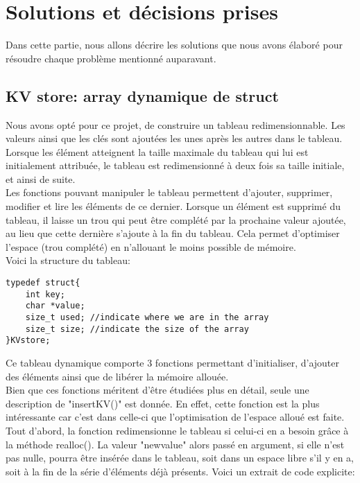 \documentclass[11pt,a4paper]{article}
\begin{document}
\section{Solutions et décisions prises}
Dans cette partie, nous allons décrire les solutions que nous avons élaboré pour résoudre chaque problème mentionné auparavant. 

\newpage
\subsection{KV store: array dynamique de struct}
Nous avons opté pour ce projet, de construire un tableau redimensionnable. Les valeurs ainsi que les clés sont ajoutées les unes après les autres dans le tableau. Lorsque les élément atteignent la taille maximale du tableau qui lui est initialement attribuée, le tableau est redimensionné à deux fois sa taille initiale, et ainsi de suite.\\
Les fonctions pouvant manipuler le tableau permettent d'ajouter, supprimer, modifier et  lire les éléments de ce dernier. Lorsque un élément est supprimé du tableau, il laisse un trou qui peut être complété par la prochaine valeur ajoutée, au lieu que cette dernière s'ajoute à la fin du tableau. Cela permet d'optimiser l'espace (trou complété) en n'allouant le moins possible de mémoire.\\
Voici la structure du tableau:

\begin{lstlisting}
typedef struct{
    int key; 
    char *value;
    size_t used; //indicate where we are in the array
    size_t size; //indicate the size of the array
}KVstore;
\end{lstlisting}

Ce tableau dynamique comporte 3 fonctions permettant d'initialiser, d'ajouter des éléments ainsi que de libérer la mémoire allouée. \\
Bien que ces fonctions méritent d'être étudiées plus en détail, seule une description de "insertKV()" est donnée. En effet, cette fonction est la plus intéressante car c'est dans celle-ci que l'optimisation de l'espace alloué est faite.\\
Tout d'abord, la fonction redimensionne le tableau si celui-ci en a besoin  grâce à la méthode realloc(). La valeur "newvalue" alors passé en argument, si elle n'est pas nulle,  pourra être insérée dans le tableau, soit dans un espace libre s'il y en a, soit à la fin de la série d'éléments déjà présents. Voici un extrait de code explicite:
\end{document}
